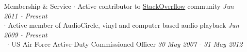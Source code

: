 
\begin{rSection}{Membership \& Service}
  $\cdot$ Active contributor to 
  \href{http://stackoverflow.com/users/822162/clayton-stanley}{StackOverflow}
  community \hfill {\em Jun 2011 - Present} \\
  $\cdot$ Active member of
  AudioCircle,
  vinyl and computer-based audio playback
  \hfill {\em Jun 2009 - Present} \\
  ~$\cdot$ US Air Force Active-Duty Commissioned Officer
  \hfill {\em 30 May 2007 - 31 May 2012}
\end{rSection}

